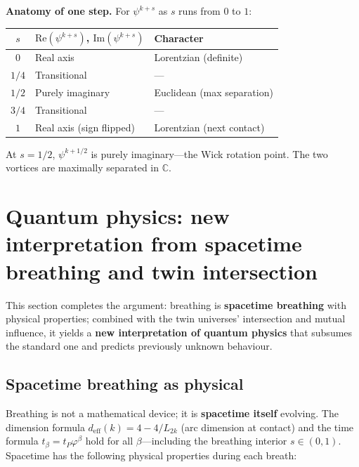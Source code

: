 \documentclass[12pt,a4paper]{article}
\begin{document}
\medskip
\noindent\textbf{Anatomy of one step.} For $\psi^{k+s}$ as $s$ runs from $0$ to $1$:
\begin{center}
\begin{tabular}{|c|l|l|}
\hline
$s$ & $\mathrm{Re}(\psi^{k+s})$, $\mathrm{Im}(\psi^{k+s})$ & Character \\
\hline
$0$ & Real axis & Lorentzian (definite) \\
$1/4$ & Transitional & --- \\
$1/2$ & Purely imaginary & Euclidean (max separation) \\
$3/4$ & Transitional & --- \\
$1$ & Real axis (sign flipped) & Lorentzian (next contact) \\
\hline
\end{tabular}
\end{center}
At $s = 1/2$, $\psi^{k+1/2}$ is purely imaginary---the Wick rotation point. The two vortices are maximally separated in $\mathbb{C}$.

\section{Quantum physics: new interpretation from spacetime breathing and twin intersection}
\label{sec:quantum-interpretation}

This section completes the argument: breathing is \textbf{spacetime breathing} with physical properties; combined with the twin universes' intersection and mutual influence, it yields a \textbf{new interpretation of quantum physics} that subsumes the standard one and predicts previously unknown behaviour.

\subsection{Spacetime breathing as physical}

Breathing is not a mathematical device; it is \textbf{spacetime itself} evolving. The dimension formula $d_{\mathrm{eff}}(k) = 4 - 4/L_{2k}$ (arc dimension at contact) and the time formula $t_\beta = t_P\varphi^\beta$ hold for all $\beta$---including the breathing interior $s \in (0,1)$. Spacetime has the following physical properties during each breath:
\end{document}
